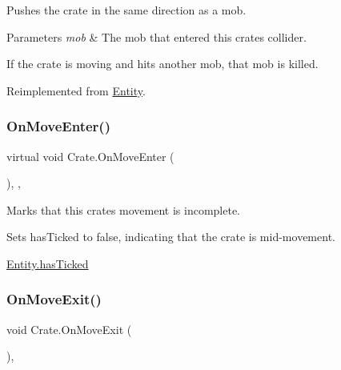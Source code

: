 Pushes the crate in the same direction as a mob. 


\begin{DoxyParams}{Parameters}
{\em mob} & The mob that entered this crate\textquotesingle{}s collider. \\
\hline
\end{DoxyParams}


If the crate is moving and hits another mob, that mob is killed. 

Reimplemented from \mbox{\hyperlink{class_entity_a92558812563a875ea0e6c3a781ab50bd}{Entity}}.

\mbox{\label{class_crate_a62c69318065c0cd28b018cce05ff279c}} 
\subsubsection{\texorpdfstring{On\+Move\+Enter()}{OnMoveEnter()}}
{\footnotesize\ttfamily virtual void Crate.\+On\+Move\+Enter (\begin{DoxyParamCaption}{ }\end{DoxyParamCaption})\hspace{0.3cm}{\ttfamily [inline]}, {\ttfamily [protected]}, {\ttfamily [virtual]}}



Marks that this crate\textquotesingle{}s movement is incomplete. 

Sets has\+Ticked to false, indicating that the crate is mid-\/movement. 

\mbox{\hyperlink{class_entity_a5c863af2a4933e264e30be69644c749e}{Entity.\+has\+Ticked}} \mbox{\label{class_crate_ad4fe1232707b8bb92c6587bf759d4182}} 
\subsubsection{\texorpdfstring{On\+Move\+Exit()}{OnMoveExit()}}
{\footnotesize\ttfamily void Crate.\+On\+Move\+Exit (\begin{DoxyParamCaption}{ }\end{DoxyParamCaption})\hspace{0.3cm}{\ttfamily [inline]}, {\ttfamily [protected]}}



